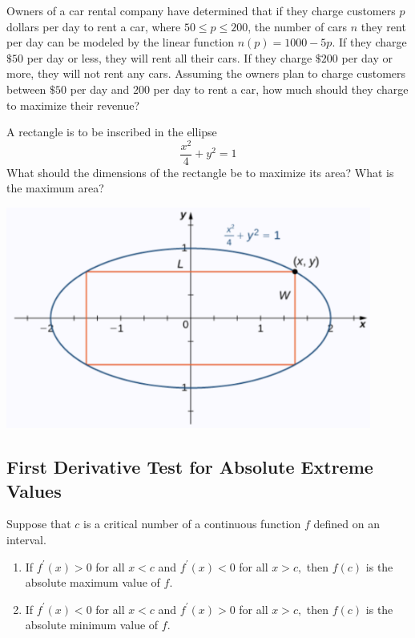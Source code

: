 \begin{example}

Owners of a car rental company have determined that if they charge
customers \(p\) dollars per day to rent a car, where \(50 \le p \le 200\), the
number of cars \(n\) they rent per day can be modeled by the linear
function \(n(p)=1000 - 5p\). If they charge \(\$50\) per day or less, they
will rent all their cars. If they charge \(\$200\) per day or more, they
will not rent any cars. Assuming the owners plan to charge customers
between \(\$50\) per day and \(200\) per day to rent a car, how much
should they charge to maximize their revenue?

\end{example}
\vspace*{6\baselineskip}

\begin{example}

A rectangle is to be inscribed in the ellipse \[\dfrac{x^2}{4}+y^2=1\]
What should the dimensions of the rectangle be to maximize its area?
What is the maximum area?

\includegraphics[width=0.9\textwidth]{img/image-20200420234107555.png}

\end{example}
\vspace*{6\baselineskip}

\hypertarget{first-derivative-test-for-absolute-extreme-values}{%
\subsection{First Derivative Test for Absolute Extreme
Values}\label{first-derivative-test-for-absolute-extreme-values}}

\begin{theorem}

Suppose that \(c\) is a critical number of a continuous function \(f\)
defined on an interval.

\begin{enumerate}[sepno]
\item
  If \(f^{\prime}(x)>0\) for all \(x<c\) and \(f^{\prime}(x)<0\) for all
  \(x>c,\) then \(f(c)\) is the absolute maximum value of \(f\).
\item
  If \(f^{\prime}(x)<0\) for all \(x<c\) and \(f^{\prime}(x)>0\) for all
  \(x>c,\) then \(f(c)\) is the absolute minimum value of \(f\).
\end{enumerate}

\end{theorem}

